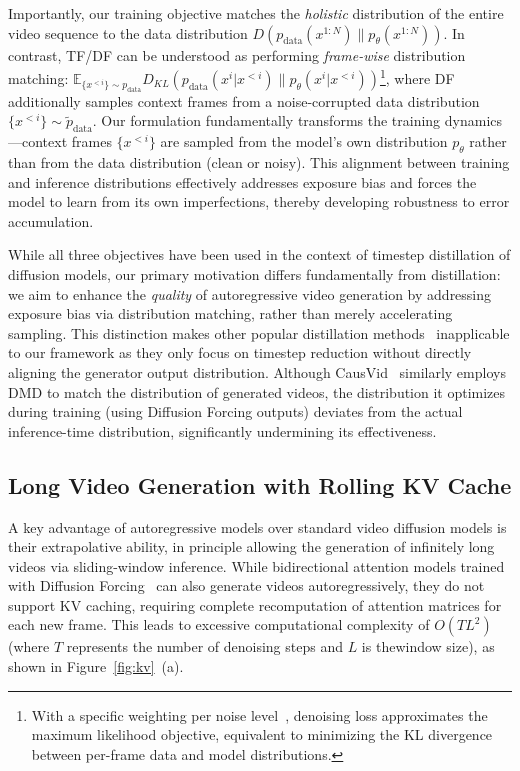 \documentclass{article}
\begin{document}
Importantly, our training objective matches the \textit{holistic} distribution of the entire video sequence to the data distribution $D(p_{\text{data}}(x^{1:N}) \| p_\theta(x^{1:N}))$. In contrast, TF/DF can be understood as performing \textit{frame-wise} distribution matching: $\mathbb{E}_{\{x^{<i}\}\sim p_{\text{data}}} D_{KL}(p_{\text{data}}(x^{i}|x^{<i}) \| p_\theta(x^{i}|x^{<i}))$\footnote{With a specific weighting per noise level~\cite{kingma2021variational,song2021maximum}, denoising loss approximates the maximum likelihood objective, equivalent to minimizing the KL divergence between per-frame data and model distributions.}, where DF additionally samples context frames from a noise-corrupted data distribution $\{x^{<i}\}\sim\tilde{p}_{\text{data}}$.
Our formulation fundamentally transforms the training dynamics—context frames $\{x^{<i}\}$ are sampled from the model's own distribution $p_\theta$ rather than from the data distribution (clean or noisy). This alignment between training and inference distributions effectively addresses exposure bias and forces the model to learn from its own imperfections, thereby developing robustness to error accumulation.

While all three objectives have been used in the context of timestep distillation of diffusion models, our primary motivation differs fundamentally from distillation: we aim to enhance the \textit{quality} of autoregressive video generation by addressing exposure bias via distribution matching, rather than merely accelerating sampling.
This distinction makes other popular distillation methods~\cite{song2023consistency} inapplicable to our framework as they only focus on timestep reduction without directly aligning the generator output distribution.
Although CausVid~\cite{yin2025causvid} similarly employs DMD to match the distribution of generated videos, the distribution it optimizes during training (using Diffusion Forcing outputs) deviates from the actual inference-time distribution, significantly undermining its effectiveness.

\subsection{Long Video Generation with Rolling KV Cache}
\label{sec:rolling_kv}

A key advantage of autoregressive models over standard video diffusion models is their extrapolative ability, in principle allowing the generation of infinitely long videos via sliding-window inference.
While bidirectional attention models trained with Diffusion Forcing~\cite{song2025history,chen2025skyreels} can also generate videos autoregressively, they do not support KV caching, requiring complete recomputation of attention matrices for each new frame. This leads to excessive computational complexity of $O(TL^2)$ (where $T$ represents the number of denoising steps and $L$ is thewindow size), as shown in Figure~\ref{fig:kv}~(a).
\end{document}
